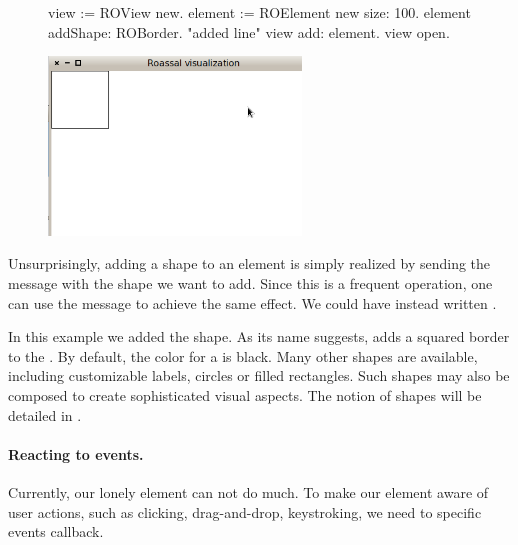 \documentclass[a4paper,10pt,twoside]{book}
\begin{document}
\begin{figure}[H]
      \begin{minipage}[t]{0.5\textwidth}
      \vspace{0pt}
\begin{code}{}
view := ROView new.
element := ROElement new size: 100.
element addShape: ROBorder. "added line"
view add: element.
view open.
\end{code}
   \end{minipage}
   \hfill
   \begin{minipage}[t]{0.6\textwidth}
      \vspace{0pt} \raggedright
       \centering
		\includegraphics[width=0.6\textwidth]{ex2}
   \end{minipage}
\label{fig:ex2}
\end{figure}

Unsurprisingly, adding a shape to an element is simply realized by sending the  message with the shape we want to add. Since this is a frequent operation, one can use the \ct{+} message to achieve the same effect. We could have instead written . 

In this example we added the  shape. As its name suggests,  adds a squared border to the . By default, the color for a  is black. Many other shapes are available, including customizable labels, circles or filled rectangles. Such shapes may also be composed to create sophisticated visual aspects. The notion of shapes will be detailed in .

\paragraph{Reacting to events.}
Currently, our lonely element can not do much. To make our element aware of user actions, such as clicking, drag-and-drop, keystroking, we need to specific events callback. 
\end{document}
